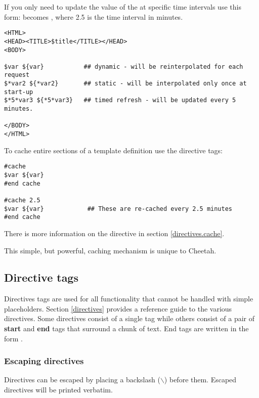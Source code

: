 If you only need to update the value of the  at specific
time intervals use this form:  becomes  ,
where 2.5 is the time interval in minutes.  

\begin{verbatim}
<HTML>
<HEAD><TITLE>$title</TITLE></HEAD>
<BODY>

$var ${var}           ## dynamic - will be reinterpolated for each request
$*var2 ${*var2}       ## static - will be interpolated only once at start-up
$*5*var3 ${*5*var3}   ## timed refresh - will be updated every 5 minutes.

</BODY>
</HTML>
\end{verbatim}

To cache entire sections of a template definition use the  directive tags:
\begin{verbatim}
#cache
$var ${var}
#end cache 

#cache 2.5
$var ${var}            ## These are re-cached every 2.5 minutes
#end cache 
\end{verbatim}

There is more information on the  directive in section
\ref{directives.cache}.

This simple, but powerful, caching mechanism is unique to Cheetah.

\subsection{Directive tags}
\label{TDL.directives}
Directives tags are used for all functionality that cannot be handled with
simple placeholders. Section \ref{directives} provides a reference guide to the
various directives.  Some directives consist of a single tag while others
consist of a pair of {\bf start} and {\bf end} tags that surround a chunk of
text.  End tags are written in the form .

\subsubsection{Escaping directives}
\label{TDL.directives.escaping}

Directives can be escaped by placing a backslash ($\backslash$) before them.
Escaped directives will be printed verbatim.

